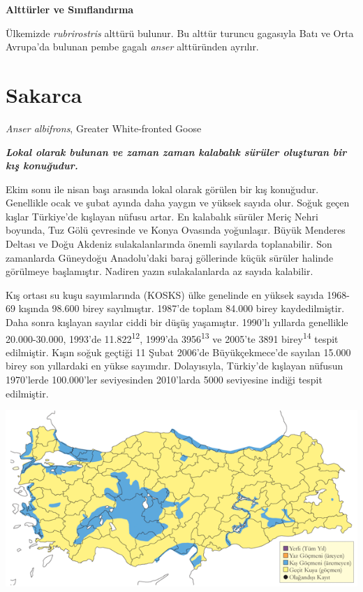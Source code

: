\documentclass[
  letterpaper,
  DIV=11,
  numbers=noendperiod]{scrreprt}
\begin{document}
\textbf{Alttürler ve Sınıflandırma}

Ülkemizde \emph{rubrirostris} alttürü bulunur. Bu alttür turuncu
gagasıyla Batı ve Orta Avrupa'da bulunan pembe gagalı \emph{anser}
alttüründen ayrılır.

\hypertarget{sakarca}{%
\section{Sakarca}\label{sakarca}}

\emph{Anser albifrons}, Greater White-fronted Goose

\textbf{\emph{Lokal olarak bulunan ve zaman zaman kalabalık sürüler
oluşturan bir kış konuğudur.}}

Ekim sonu ile nisan başı arasında lokal olarak görülen bir kış
konuğudur. Genellikle ocak ve şubat ayında daha yaygın ve yüksek sayıda
olur. Soğuk geçen kışlar Türkiye'de kışlayan nüfusu artar. En kalabalık
sürüler Meriç Nehri boyunda, Tuz Gölü çevresinde ve Konya Ovasında
yoğunlaşır. Büyük Menderes Deltası ve Doğu Akdeniz sulakalanlarında
önemli sayılarda toplanabilir. Son zamanlarda Güneydoğu Anadolu'daki
baraj göllerinde küçük sürüler halinde görülmeye başlamıştır. Nadiren
yazın sulakalanlarda az sayıda kalabilir.

Kış ortası su kuşu sayımlarında (KOSKS) ülke genelinde en yüksek sayıda
1968-69 kışında 98.600 birey sayılmıştır. 1987'de toplam 84.000 birey
kaydedilmiştir. Daha sonra kışlayan sayılar ciddi bir düşüş yaşamıştır.
1990'lı yıllarda genellikle 20.000-30.000, 1993'de
11.822\textsuperscript{12}, 1999'da 3956\textsuperscript{13} ve 2005'te
3891 birey\textsuperscript{14} tespit edilmiştir. Kışın soğuk geçtiği 11
Şubat 2006'de Büyükçekmece'de sayılan 15.000 birey son yıllardaki en
yükse sayımdır. Dolayısıyla, Türkiy'de kışlayan nüfusun 1970'lerde
100.000'ler seviyesinden 2010'larda 5000 seviyesine indiği tespit
edilmiştir.

\includegraphics{images/harita_Page_003.png}
\end{document}
